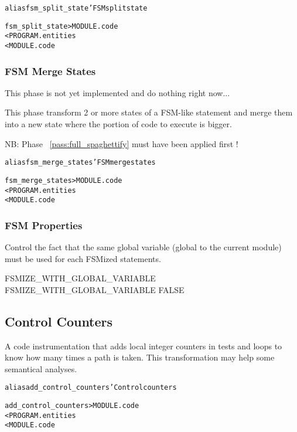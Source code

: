 \documentclass[a4paper]{report}
\newenvironment{PipsMake}{\begin{alltt}}{\end{alltt}}
\newcommand{\PipsPassRef}[1]{\texttt{\detokenize{#1}}~\ref{pass:#1}}
\newenvironment{PipsPass}[1]{\label{pass:#1}}{}
\begin{document}
\begin{PipsMake}
alias fsm_split_state 'FSM split state

fsm_split_state    > MODULE.code
        < PROGRAM.entities
        < MODULE.code
\end{PipsMake}

\subsubsection{FSM Merge States}
\label{paragraph-fsm-merge-states}

\begin{PipsPass}{fsm_merge_states}
This phase is not yet implemented and do nothing right now...

This phase transform 2 or more states of a FSM-like statement and merge
them into a new state where the portion of code to execute is bigger.

NB: Phase \PipsPassRef{full_spaghettify}
must have been applied first !
\end{PipsPass}

\begin{PipsMake}
alias fsm_merge_states 'FSM merge states

fsm_merge_states    > MODULE.code
        < PROGRAM.entities
        < MODULE.code
\end{PipsMake}


\subsubsection{FSM Properties}

Control the fact that the same global variable (global to the
current module) must be used for each FSMized statements.

\begin{PipsProp}{FSMIZE_WITH_GLOBAL_VARIABLE}
FSMIZE_WITH_GLOBAL_VARIABLE FALSE
\end{PipsProp}

\subsection{Control Counters}

A code instrumentation that adds local integer counters in tests and loops
to know how many times a path is taken. This transformation may
help some semantical analyses.

\begin{PipsMake}
alias add_control_counters 'Control counters

add_control_counters    > MODULE.code
        < PROGRAM.entities
        < MODULE.code
\end{PipsMake}
\end{document}
